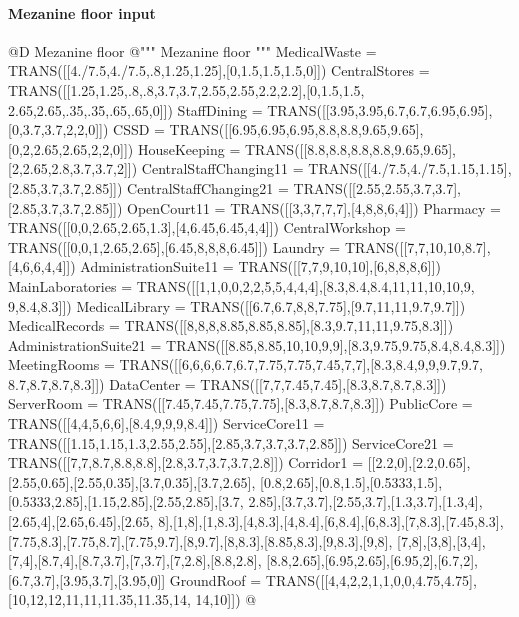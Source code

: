 \documentclass[11pt,oneside]{article}    %
\begin{document}
\paragraph{Mezanine floor input}

@D Mezanine floor
@{""" Mezanine floor """
MedicalWaste = TRANS([[4./7.5,4./7.5,.8,1.25,1.25],[0,1.5,1.5,1.5,0]])
CentralStores = TRANS([[1.25,1.25,.8,.8,3.7,3.7,2.55,2.55,2.2,2.2],[0,1.5,1.5,
    2.65,2.65,.35,.35,.65,.65,0]])
StaffDining = TRANS([[3.95,3.95,6.7,6.7,6.95,6.95],[0,3.7,3.7,2,2,0]])
CSSD = TRANS([[6.95,6.95,6.95,8.8,8.8,9.65,9.65],[0,2,2.65,2.65,2,2,0]])
HouseKeeping = TRANS([[8.8,8.8,8.8,8.8,9.65,9.65],[2,2.65,2.8,3.7,3.7,2]])
CentralStaffChanging11 = TRANS([[4./7.5,4./7.5,1.15,1.15],[2.85,3.7,3.7,2.85]])
CentralStaffChanging21 = TRANS([[2.55,2.55,3.7,3.7],[2.85,3.7,3.7,2.85]])
OpenCourt11 = TRANS([[3,3,7,7,7],[4,8,8,6,4]])
Pharmacy = TRANS([[0,0,2.65,2.65,1.3],[4,6.45,6.45,4,4]])
CentralWorkshop = TRANS([[0,0,1,2.65,2.65],[6.45,8,8,8,6.45]])
Laundry = TRANS([[7,7,10,10,8.7],[4,6,6,4,4]])
AdministrationSuite11 = TRANS([[7,7,9,10,10],[6,8,8,8,6]])
MainLaboratories = TRANS([[1,1,0,0,2,2,5,5,4,4,4],[8.3,8.4,8.4,11,11,10,10,9,
    9,8.4,8.3]])
MedicalLibrary = TRANS([[6.7,6.7,8,8,7.75],[9.7,11,11,9.7,9.7]])
MedicalRecords = TRANS([[8,8,8,8.85,8.85,8.85],[8.3,9.7,11,11,9.75,8.3]])
AdministrationSuite21 = TRANS([[8.85,8.85,10,10,9,9],[8.3,9.75,9.75,8.4,8.4,8.3]])
MeetingRooms = TRANS([[6,6,6,6.7,6.7,7.75,7.75,7.45,7,7],[8.3,8.4,9,9,9.7,9.7,
    8.7,8.7,8.7,8.3]])
DataCenter = TRANS([[7,7,7.45,7.45],[8.3,8.7,8.7,8.3]])
ServerRoom = TRANS([[7.45,7.45,7.75,7.75],[8.3,8.7,8.7,8.3]])
PublicCore = TRANS([[4,4,5,6,6],[8.4,9,9,9,8.4]])
ServiceCore11 = TRANS([[1.15,1.15,1.3,2.55,2.55],[2.85,3.7,3.7,3.7,2.85]])
ServiceCore21 = TRANS([[7,7,8.7,8.8,8.8],[2.8,3.7,3.7,3.7,2.8]])
Corridor1 = [[2.2,0],[2.2,0.65],[2.55,0.65],[2.55,0.35],[3.7,0.35],[3.7,2.65],
    [0.8,2.65],[0.8,1.5],[0.5333,1.5],[0.5333,2.85],[1.15,2.85],[2.55,2.85],[3.7,
    2.85],[3.7,3.7],[2.55,3.7],[1.3,3.7],[1.3,4],[2.65,4],[2.65,6.45],[2.65,
    8],[1,8],[1,8.3],[4,8.3],[4,8.4],[6,8.4],[6,8.3],[7,8.3],[7.45,8.3],
    [7.75,8.3],[7.75,8.7],[7.75,9.7],[8,9.7],[8,8.3],[8.85,8.3],[9,8.3],[9,8],
    [7,8],[3,8],[3,4],[7,4],[8.7,4],[8.7,3.7],[7,3.7],[7,2.8],[8.8,2.8],
    [8.8,2.65],[6.95,2.65],[6.95,2],[6.7,2],[6.7,3.7],[3.95,3.7],[3.95,0]]
GroundRoof = TRANS([[4,4,2,2,1,1,0,0,4.75,4.75],[10,12,12,11,11,11.35,11.35,14,
    14,10]])
@}
\end{document}
